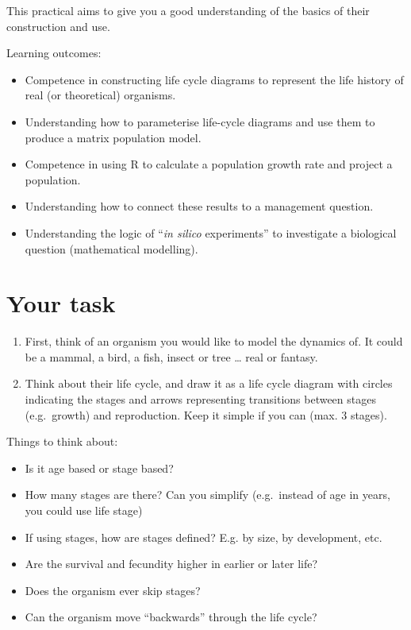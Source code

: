 \documentclass[
  a4paper]{book}
\providecommand{\tightlist}{%
  \setlength{\itemsep}{0pt}\setlength{\parskip}{0pt}}
\begin{document}
This practical aims to give you a good understanding of the basics of their construction and use.

\begin{do-something}
Learning outcomes:

\begin{itemize}
\tightlist
\item
  Competence in constructing life cycle diagrams to represent the life
  history of real (or theoretical) organisms.
\item
  Understanding how to parameterise life-cycle diagrams and use them to
  produce a matrix population model.
\item
  Competence in using R to calculate a population growth rate and
  project a population.
\item
  Understanding how to connect these results to a management question.
\item
  Understanding the logic of ``\emph{in silico} experiments'' to
  investigate a biological question (mathematical modelling).
\end{itemize}
\end{do-something}

\hypertarget{your-task-6}{%
\section{Your task}\label{your-task-6}}

\begin{enumerate}
\def\labelenumi{\arabic{enumi})}
\item
  First, think of an organism you would like to model the dynamics of. It could be a mammal, a bird, a fish, insect or tree \ldots{} real or fantasy.
\item
  Think about their life cycle, and draw it as a life cycle diagram with circles indicating the stages and arrows representing transitions between stages (e.g.~growth) and reproduction. Keep it simple if you can (max. 3 stages).
\end{enumerate}

Things to think about:

\begin{itemize}
\tightlist
\item
  Is it age based or stage based?
\item
  How many stages are there? Can you simplify (e.g.~instead of age in years, you could use life stage)
\item
  If using stages, how are stages defined? E.g. by size, by development, etc.
\item
  Are the survival and fecundity higher in earlier or later life?
\item
  Does the organism ever skip stages?
\item
  Can the organism move ``backwards'' through the life cycle?
\end{itemize}
\end{document}
